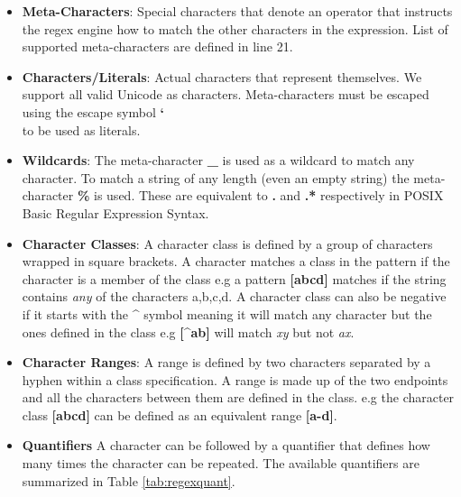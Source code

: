 \begin{itemize}
    \item \textbf{Meta-Characters}: Special characters that denote an operator that instructs the regex engine how to match the other characters in the expression. List of supported meta-characters are defined in line 21.
    
    \item \textbf{Characters/Literals}: Actual characters that represent themselves. We support all valid Unicode as characters. Meta-characters must be escaped using the escape symbol \textbf{\char`\\} to be used as literals.
    
    \item \textbf{Wildcards}: The meta-character \textbf{\_} is used as a wildcard to match any character. To match a string of any length (even an empty string) the meta-character \textbf{\%} is used. These are equivalent to \textbf{.} and \textbf{.*} respectively in POSIX Basic Regular Expression Syntax.
    
    \item \textbf{Character Classes}: A character class is defined by a group of characters wrapped in square brackets. A character matches a class in the pattern if the character is a member of the class e.g a pattern \textbf{[abcd]} matches if the string contains \textit{any} of the characters a,b,c,d. A character class can also be negative if it starts with the \textbf{\^{}} symbol meaning it will match any character but the ones defined in the class e.g \textbf{[\^{}ab]} will match \textit{xy} but not \textit{ax}.
    
    \item \textbf{Character Ranges}: A range is defined by two characters separated by a hyphen within a class specification. A range is made up of the two endpoints and all the characters between them are defined in the class. e.g the character class \textbf{[abcd]} can be defined as an equivalent range \textbf{[a-d]}.
    
    \item \textbf{Quantifiers} A character can be followed by a quantifier that defines how many times the character can be repeated. The available quantifiers are summarized in Table \ref{tab:regexquant}.
    

\newcommand\rownumber{\stepcounter{magicrownumbers}\arabic{magicrownumbers}}


\end{itemize}
